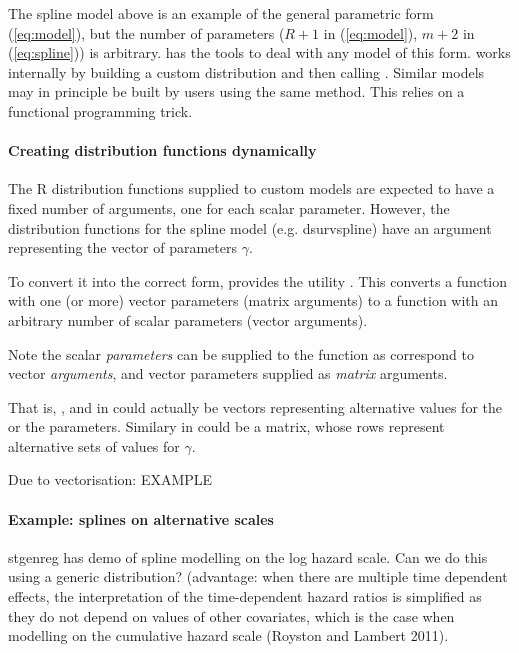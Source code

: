 \documentclass[nojss,nofooter]{jss}
\begin{document}
The spline model above is an example of the general parametric form
(\ref{eq:model}), but the number of parameters ($R+1$ in
(\ref{eq:model}), $m+2$ in (\ref{eq:spline})) is arbitrary.
 has the tools to deal with any model of this form.
 works internally by building a custom
distribution and then calling .  Similar models may
in principle be built by users using the same method.  This relies on
a functional programming trick.

\paragraph{Creating distribution functions dynamically}

The R distribution functions supplied to custom models are expected to
have a fixed number of arguments, one for each scalar parameter.
However, the distribution functions for the spline model
(e.g. dsurvspline) have an argument  representing the
vector of parameters $\gamma$.  


To convert it into the correct form,  provides the
utility .  This converts a function with one (or
more) vector parameters (matrix arguments) to a function with an
arbitrary number of scalar parameters (vector arguments).

Note the scalar \emph{parameters} can be supplied to the function as
correspond to vector \emph{arguments}, and vector parameters supplied
as \emph{matrix} arguments.

That is, , and  in
 could actually be vectors representing
alternative values for the  or the parameters.  Similary
 in  could be a matrix,
  whose rows represent alternative sets of values for $\gamma$.

Due to vectorisation:  EXAMPLE



\paragraph{Example: splines on alternative scales}

stgenreg has demo of spline modelling on the log hazard scale.  Can we do this using a generic distribution? 
(advantage: when there are multiple time dependent effects, the
interpretation of the time-dependent hazard ratios is simplified as
they do not depend on values of other covariates, which is the case
when modelling on the cumulative hazard scale (Royston and Lambert
2011).
\end{document}
